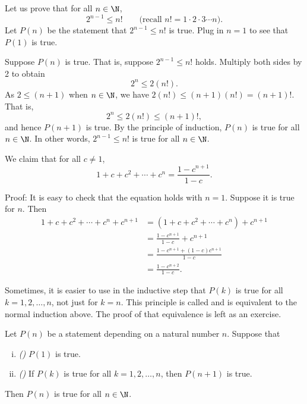 \begin{example}
Let us prove that for all $n \in \N$,
\begin{equation*}
2^{n-1} \leq n! \qquad \text{(recall } n! = 1 \cdot 2 \cdot 3 \cdots n\text{)}.
\end{equation*}
Let $P(n)$ be the statement that
$2^{n-1} \leq n!$ is true.
Plug in $n=1$ to see that $P(1)$ is true.

Suppose $P(n)$ is true.  That is, suppose 
$2^{n-1} \leq n!$ holds.  Multiply both sides by 2 to obtain
\begin{equation*}
2^n \leq 2(n!) .
\end{equation*}
As $2 \leq (n+1)$ when $n \in \N$, we have
$2(n!) \leq (n+1)(n!) = (n+1)!$.  That is,
\begin{equation*}
2^n \leq 2(n!) \leq  (n+1)!,
\end{equation*}
and hence $P(n+1)$ is true.  By the principle of induction,
$P(n)$
is true for all $n \in \N$.  In other words,
$2^{n-1} \leq n!$ is true for all $n \in \N$.
\end{example}

\begin{example} \label{example:geometricsum}
We claim that for all $c \not= 1$,
\begin{equation*}
1 + c + c^2 + \cdots + c^n = \frac{1-c^{n+1}}{1-c} .
\end{equation*}

Proof: It is easy to check that the equation holds with $n=1$.  Suppose 
it is true for $n$.  Then
\begin{equation*}
\begin{split}
1 + c + c^2 + \cdots + c^n + c^{n+1} & =
( 1 + c + c^2 + \cdots + c^n ) + c^{n+1} \\
& = \frac{1-c^{n+1}}{1-c}  + c^{n+1} \\
& = \frac{1-c^{n+1}  + (1-c)c^{n+1}}{1-c} \\
& = \frac{1-c^{n+2}}{1-c} .
\end{split}
\end{equation*}
\end{example}

Sometimes, it is easier to use in the inductive step
that $P(k)$ is true for all $k = 1,2,\ldots,n$, not just for $k=n$.
This principle is called \emph{} and is equivalent
to the normal induction above.  The proof of that
equivalence is left as an exercise.

\begin{thm}
Let $P(n)$ be a statement depending on a natural number $n$.  Suppose that
\begin{enumerate}[(i)]
\item \emph{()} $P(1)$ is true.
\item \emph{()} If $P(k)$ is true for all $k = 1,2,\ldots,n$, then $P(n+1)$ is true.
\end{enumerate}
Then $P(n)$ is true for all $n \in \N$.
\end{thm}

